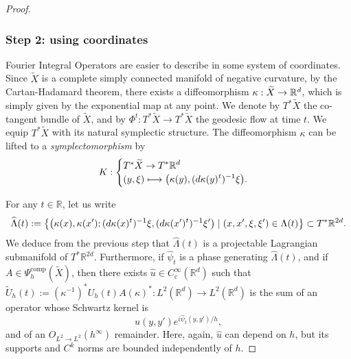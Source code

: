 \documentclass[10pt]{amsart}
\newcommand\mto{\mathchoice{\longmapsto}{\mapsto}{\mapsto}{\mapsto}}
\let\sep\mid
\newcommand{\rc}{\mathrm{c}}
\newcommand{\comp}{\mathrm{comp}}
\theoremstyle{plain}
\theoremstyle{definition}
\newcommand{\R}{\mathbb{R}}
\let\dpl\displaystyle
\begin{document}
\begin{proof}
\subsubsection*{Step 2: using coordinates}
Fourier Integral Operators are easier to describe in some system of coordinates. Since $\widetilde{X}$ is a complete simply connected manifold of negative curvature, by the Cartan-Hadamard theorem, there exists a diffeomorphism $\kappa : \widetilde{X} \to\nobreak \R^d$, which is simply given by the exponential map at any point. We denote by $T^*\widetilde{X}$ the co-tangent bundle of $\widetilde{X}$, and by $\Phi^t : T^*\widetilde{X}\to T^* \widetilde{X}$ the geodesic flow at time $t$. We equip $T^*\widetilde{X}$ with its natural symplectic structure. The diffeomorphism $\kappa$ can be lifted to a \emph{symplectomorphism} by
\begin{equation}\label{eq:SymplLift}
K :
\begin{cases}
T^* \widetilde{X} \dpl\to T^* \R^d \\
(y,\xi)\dpl\mto \big{(}\kappa(y), (d\kappa(y)^t)^{-1}\xi\big{)}.
\end{cases}
\end{equation}

For any $t\in \R$, let us write
\[
\widehat{\Lambda}(t):= \left\{\big{(}\kappa(x), \kappa(x') ; (d\kappa(x)^t)^{-1}\xi, (d\kappa(x')^t)^{-1}\xi'\big{)} \sep (x,x',\xi,\xi')\in \Lambda(t) \right\}\subset T^*\R^{2d}.
\]
We deduce from the previous step that $\widehat{\Lambda}(t)$ is a projectable Lagrangian submanifold of $T^*\R^{2d}$.
Furthermore, if $\widehat{\psi}_t$ is a phase generating $\widehat{\Lambda}(t)$,
and if $A\in \Psi_h^{\comp}(\widetilde{X})$, then there exists $\widehat{u}\in C_\rc^\infty(\R^d)$ such that
$\tilde{U}_h(t):= (\kappa^{-1})^* U_h(t)A (\kappa)^* : L^2(\R^d)\to L^2(\R^d)$
is the sum of an operator whose Schwartz kernel is
\begin{equation}\label{eq:IntKer}
\widehat{u}(y,y') e^{i\widehat{\psi}_t(y,y')/h},
\end{equation}
and of an $O_{L^2\to L^2}(h^\infty)$ remainder. Here, again, $\widehat{u}$ can depend on $h$, but its supports and $C^k$ norms are bounded independently of $h$.


\end{proof}
\end{document}
